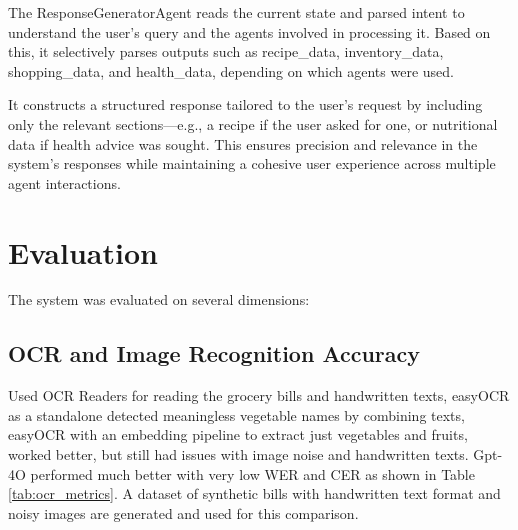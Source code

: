 \documentclass{ecai}
\begin{document}
The ResponseGeneratorAgent reads the current state and parsed intent to understand the user's query and the agents involved in processing it. Based on this, it selectively parses outputs such as recipe\_data, inventory\_data, shopping\_data, and health\_data, depending on which agents were used.

It constructs a structured response tailored to the user's request by including only the relevant sections—e.g., a recipe if the user asked for one, or nutritional data if health advice was sought. This ensures precision and relevance in the system's responses while maintaining a cohesive user experience across multiple agent interactions.

\section{Evaluation}

The system was evaluated on several dimensions:

\subsection{OCR and Image Recognition Accuracy}

Used OCR Readers for reading the grocery bills and handwritten texts, easyOCR as a standalone detected meaningless vegetable names by combining texts, easyOCR with an embedding pipeline to extract just vegetables and fruits, worked better, but still had issues with image noise and handwritten texts. Gpt-4O performed much better with very low WER and CER as shown in Table \ref{tab:ocr_metrics}. A dataset of synthetic bills with handwritten text format and noisy images are generated and used for this comparison.

\begin{table}[ht]
\centering
{}
\caption{Comparison of OCR accuracy using Word Error Rate (WER) and Character Error Rate (CER) metrics}
\label{tab:ocr_metrics}
\end{table}
\end{document}
